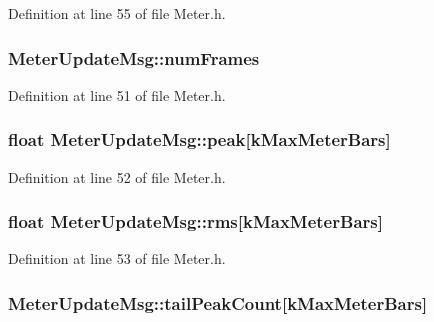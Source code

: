 Definition at line 55 of file Meter.\+h.

\subsubsection[{\texorpdfstring{num\+Frames}{numFrames}}]{ Meter\+Update\+Msg\+::num\+Frames}\hypertarget{class_meter_update_msg_a075414b7b82c0c40fecce46c2dddc217}{}\label{class_meter_update_msg_a075414b7b82c0c40fecce46c2dddc217}


Definition at line 51 of file Meter.\+h.

\subsubsection[{\texorpdfstring{peak}{peak}}]{\setlength{\rightskip}{0pt plus 5cm}float Meter\+Update\+Msg\+::peak\mbox{[}{\bf k\+Max\+Meter\+Bars}\mbox{]}}\hypertarget{class_meter_update_msg_a375b091b583aa3f7cee515d8033c8f2e}{}\label{class_meter_update_msg_a375b091b583aa3f7cee515d8033c8f2e}


Definition at line 52 of file Meter.\+h.

\subsubsection[{\texorpdfstring{rms}{rms}}]{\setlength{\rightskip}{0pt plus 5cm}float Meter\+Update\+Msg\+::rms\mbox{[}{\bf k\+Max\+Meter\+Bars}\mbox{]}}\hypertarget{class_meter_update_msg_aafa73fca5107d8c49302cd0227edc8a5}{}\label{class_meter_update_msg_aafa73fca5107d8c49302cd0227edc8a5}


Definition at line 53 of file Meter.\+h.

\subsubsection[{\texorpdfstring{tail\+Peak\+Count}{tailPeakCount}}]{ Meter\+Update\+Msg\+::tail\+Peak\+Count\mbox{[}{\bf k\+Max\+Meter\+Bars}\mbox{]}}\hypertarget{class_meter_update_msg_a3c6bf541dc0bf9a9580eeb279ad0c9c9}{}\label{class_meter_update_msg_a3c6bf541dc0bf9a9580eeb279ad0c9c9}



